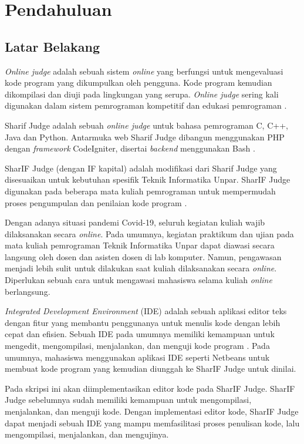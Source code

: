 \chapter{Pendahuluan}
\label{chap:intro}
   
\section{Latar Belakang}
\label{sec:label}

\textit{Online judge} adalah sebuah sistem \textit{online} yang berfungsi untuk mengevaluasi kode program yang dikumpulkan oleh pengguna. Kode program kemudian dikompilasi dan diuji pada lingkungan yang serupa. \textit{Online judge} sering kali digunakan dalam sistem pemrograman kompetitif dan edukasi pemrograman \cite{judge}.

Sharif Judge adalah sebuah \textit{online judge} untuk bahasa pemrograman C, C++, Java dan Python. Antarmuka web Sharif Judge dibangun menggunakan PHP dengan \textit{framework} CodeIgniter, disertai \textit{backend} menggunakan Bash \cite{sharif}.

SharIF Judge (dengan IF kapital) adalah modifikasi dari Sharif Judge yang disesuaikan untuk kebutuhan spesifik Teknik Informatika Unpar. SharIF Judge digunakan pada beberapa mata kuliah pemrograman untuk mempermudah proses pengumpulan dan penilaian kode program \cite{stillmen:sharif}.

Dengan adanya situasi pandemi Covid-19, seluruh kegiatan kuliah wajib dilaksanakan secara \textit{online}. Pada umumnya, kegiatan praktikum dan ujian pada mata kuliah pemrograman Teknik Informatika Unpar dapat diawasi secara langsung oleh dosen dan asisten dosen di lab komputer.  Namun, pengawasan menjadi lebih sulit untuk dilakukan saat kuliah dilaksanakan secara \textit{online}. Diperlukan sebuah cara untuk mengawasi mahasiswa selama kuliah \textit{online} berlangsung. 

{\it Integrated Development Environment} (IDE) adalah sebuah aplikasi editor teks dengan fitur yang membantu penggunanya untuk menulis kode dengan lebih cepat dan efisien. Sebuah IDE pada umumnya memiliki kemampuan untuk mengedit, mengompilasi, menjalankan, dan menguji kode program \cite{ide}.  Pada umumnya, mahasiswa menggunakan aplikasi IDE seperti Netbeans untuk membuat kode program yang kemudian diunggah ke SharIF Judge untuk dinilai.

Pada skripsi ini akan diimplementasikan editor kode pada SharIF Judge. SharIF Judge sebelumnya sudah memiliki kemampuan untuk mengompilasi, menjalankan, dan menguji kode. Dengan implementasi editor kode, SharIF Judge dapat menjadi sebuah IDE yang mampu memfasilitasi proses penulisan kode, lalu mengompilasi, menjalankan, dan mengujinya.

